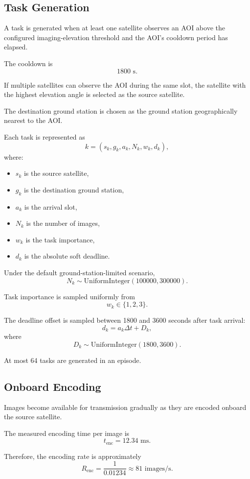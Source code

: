 \documentclass[11pt]{article}
\begin{document}
\subsection{Task Generation}

A task is generated when at least one satellite observes an AOI above the
configured imaging-elevation threshold and the AOI's cooldown period has
elapsed.

The cooldown is
\[
1800\text{ s}.
\]

If multiple satellites can observe the AOI during the same slot, the
satellite with the highest elevation angle is selected as the source
satellite.

The destination ground station is chosen as the ground station geographically
nearest to the AOI.

Each task is represented as
\[
k=
(s_k,g_k,a_k,N_k,w_k,d_k),
\]
where:
\begin{itemize}
    \item $s_k$ is the source satellite,
    \item $g_k$ is the destination ground station,
    \item $a_k$ is the arrival slot,
    \item $N_k$ is the number of images,
    \item $w_k$ is the task importance,
    \item $d_k$ is the absolute soft deadline.
\end{itemize}

Under the default ground-station-limited scenario,
\[
N_k
\sim
\mathrm{UniformInteger}(100000,300000).
\]

Task importance is sampled uniformly from
\[
w_k\in\{1,2,3\}.
\]

The deadline offset is sampled between 1800 and 3600 seconds after task
arrival:
\[
d_k
=
a_k\Delta t
+
D_k,
\]
where
\[
D_k
\sim
\mathrm{UniformInteger}(1800,3600).
\]

At most 64 tasks are generated in an episode.


\subsection{Onboard Encoding}

Images become available for transmission gradually as they are encoded
onboard the source satellite.

The measured encoding time per image is
\[
t_{\mathrm{enc}}=12.34\text{ ms}.
\]

Therefore, the encoding rate is approximately
\[
R_{\mathrm{enc}}
=
\frac{1}{0.01234}
\approx
81
\text{ images/s}.
\]
\end{document}
